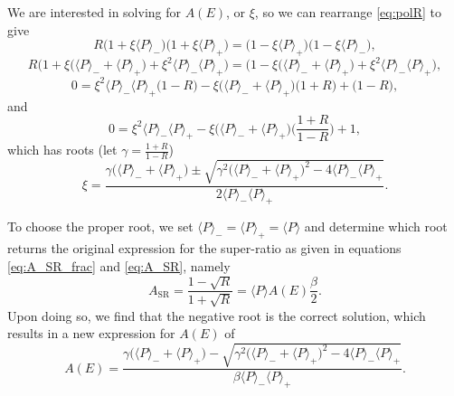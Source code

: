 We are interested in solving for $A(E)$, or $\xi$, so we can rearrange \ref{eq:polR} to give
%
\begin{equation*}
  R\Big( 1 + \xi \langle P \rangle_- \Big) \Big( 1 + \xi \langle P \rangle_+ \Big) =
  \Big( 1 - \xi \langle P \rangle_+ \Big)
    \Big( 1 - \xi \langle P \rangle_- \Big),
\end{equation*}
%
\begin{equation*}
  R\bigg( 1 + \xi \Big(\langle P \rangle_-+\langle P \rangle_+ \Big) + \xi^2\langle P \rangle_-
  \langle P \rangle_+\bigg) =
  \bigg( 1 - \xi \Big(\langle P \rangle_-+\langle P \rangle_+ \Big) + \xi^2\langle P \rangle_-
  \langle P \rangle_+\bigg),
\end{equation*}
%
\begin{equation*}
  0 = \xi^2\langle P \rangle_- \langle P \rangle_+\Big(1-R\Big)
  - \xi\Big(\langle P \rangle_-+\langle P \rangle_+ \Big)\Big(1+R\Big)
  + \Big(1-R\Big),
\end{equation*}
%
\noindent and
%
\begin{equation}
  0 = \xi^2\langle P \rangle_- \langle P \rangle_+
  - \xi\Big(\langle P \rangle_-+\langle P \rangle_+ \Big)\bigg(\frac{1+R}{1-R}\bigg)
  + 1,
\end{equation}
%
\noindent which has roots (let $\gamma = \frac{1+R}{1-R}$)
%
\begin{equation}
  \xi = \frac{\gamma\Big(\langle P \rangle_-+\langle P \rangle_+ \Big)
    \pm \sqrt{\gamma^2\Big(\langle P \rangle_-+\langle P \rangle_+ \Big)^2
      -4\langle P \rangle_- \langle P \rangle_+}}
      {2\langle P \rangle_- \langle P \rangle_+}.
\end{equation}

To choose the proper root, we set
$\langle P \rangle_- = \langle P \rangle_+ = \langle P \rangle$ and determine
which root returns the original expression for the super-ratio as given in equations
\ref{eq:A_SR_frac} and \ref{eq:A_SR}, namely
%
\begin{equation*} \label{eq:A_SR}
  A_{\mathrm{SR}} = \frac{1-\sqrt{R}}{1+\sqrt{R}} = \langle P
  \rangle  A(E)  \frac{\beta}{2}.
\end{equation*}
%
\noindent Upon doing so, we find that the negative root is the correct
solution, which results in a new expression for $A(E)$ of
%
\begin{equation}
  A(E) = \frac{\gamma\Big(\langle P \rangle_-+\langle P \rangle_+ \Big)
    - \sqrt{\gamma^2\Big(\langle P \rangle_-+\langle P \rangle_+ \Big)^2
      -4\langle P \rangle_- \langle P \rangle_+}}
      {\beta\langle P \rangle_- \langle P \rangle_+}.
\end{equation}

